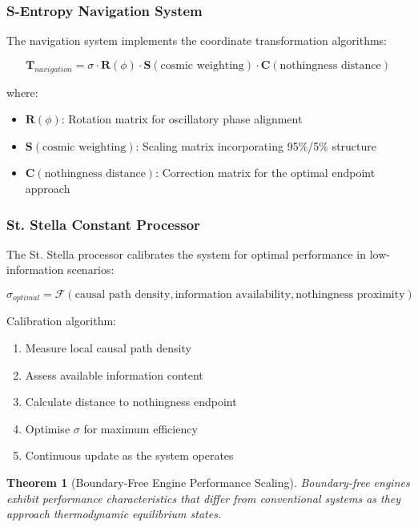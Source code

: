 \documentclass[11pt,a4paper]{article}
\newtheorem{theorem}{Theorem}[section]
\theoremstyle{remark}
\begin{document}
\subsubsection{S-Entropy Navigation System}

The navigation system implements the coordinate transformation algorithms:

\begin{equation}
\mathbf{T}_{navigation} = \sigma \cdot \mathbf{R}(\phi) \cdot \mathbf{S}(\text{cosmic weighting}) \cdot \mathbf{C}(\text{nothingness distance})
\end{equation}

where:
\begin{itemize}
\item $\mathbf{R}(\phi)$: Rotation matrix for oscillatory phase alignment
\item $\mathbf{S}(\text{cosmic weighting})$: Scaling matrix incorporating 95\%/5\% structure
\item $\mathbf{C}(\text{nothingness distance})$: Correction matrix for the optimal endpoint approach
\end{itemize}

\subsubsection{St. Stella Constant Processor}

The St. Stella processor calibrates the system for optimal performance in low-information scenarios:

\begin{equation}
\sigma_{optimal} = \mathcal{F}(\text{causal path density}, \text{information availability}, \text{nothingness proximity})
\end{equation}

Calibration algorithm:
\begin{enumerate}
\item Measure local causal path density
\item Assess available information content
\item Calculate distance to nothingness endpoint
\item Optimise $\sigma$ for maximum efficiency
\item Continuous update as the system operates
\end{enumerate}

\begin{theorem}[Boundary-Free Engine Performance Scaling]
Boundary-free engines exhibit performance characteristics that differ from conventional systems as they approach thermodynamic equilibrium states.
\end{theorem}
\end{document}
